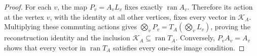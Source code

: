 \begin{proof}\leanok
    For each $v$, the map $P_v=A_vL_v$ fixes exactly
    $\operatorname{ran}A_v$. Therefore its action at the vertex $v$,
    with the identity at all other vertices, fixes every vector in
    $\mathcal K_A$. Multiplying these commuting actions gives
    $\bigotimes_vP_v=T_A(\bigotimes_vL_v)$, proving the reconstruction
    identity and the inclusion $\mathcal K_A\subseteq\operatorname{ran}T_A$.
    Conversely, $P_vA_v=A_v$ shows that every vector in
    $\operatorname{ran}T_A$ satisfies every one-site image condition.
\end{proof}
